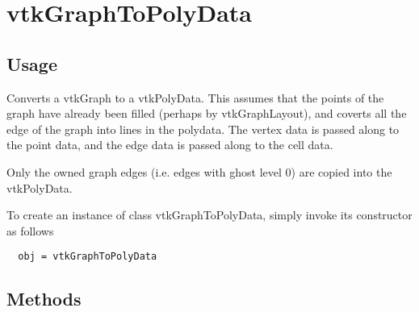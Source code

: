 \section{vtkGraphToPolyData}

\subsection{Usage}

 Converts a vtkGraph to a vtkPolyData.  This assumes that the points
 of the graph have already been filled (perhaps by vtkGraphLayout),
 and coverts all the edge of the graph into lines in the polydata.
 The vertex data is passed along to the point data, and the edge data
 is passed along to the cell data.

 Only the owned graph edges (i.e. edges with ghost level 0) are copied
 into the vtkPolyData.

To create an instance of class vtkGraphToPolyData, simply
invoke its constructor as follows
\begin{verbatim}
  obj = vtkGraphToPolyData
\end{verbatim}
\subsection{Methods}

